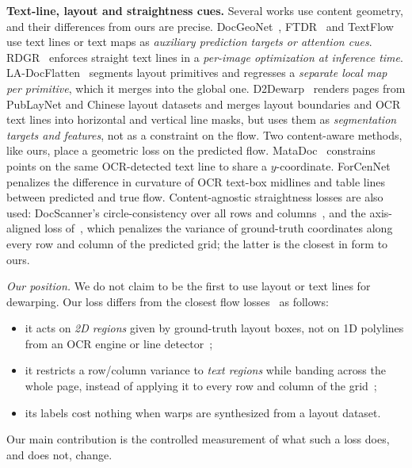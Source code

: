 \documentclass[conference]{IEEEtran}
\begin{document}
\textbf{Text-line, layout and straightness cues.}
Several works use content geometry, and their differences from ours are precise. DocGeoNet~\cite{feng2022docgeonet}, FTDR~\cite{li2023ftdr} and TextFlow~\cite{liu2026textflow} use text lines or text maps as \emph{auxiliary prediction targets or attention cues}. RDGR~\cite{jiang2022rdgr} enforces straight text lines in a \emph{per-image optimization at inference time}. LA-DocFlatten~\cite{li2024ladocflatten} segments layout primitives and regresses a \emph{separate local map per primitive}, which it merges into the global one. D2Dewarp~\cite{li2026d2dewarp} renders pages from PubLayNet and Chinese layout datasets and merges layout boundaries and OCR text lines into horizontal and vertical line masks, but uses them as \emph{segmentation targets and features}, not as a constraint on the flow. Two content-aware methods, like ours, place a geometric loss on the predicted flow. MataDoc~\cite{dai2023matadoc} constrains points on the same OCR-detected text line to share a $y$-coordinate. ForCenNet~\cite{cai2025forcennet} penalizes the difference in curvature of OCR text-box midlines and table lines between predicted and true flow. Content-agnostic straightness losses are also used: DocScanner's circle-consistency over all rows and columns~\cite{feng2025docscanner}, and the axis-aligned loss of~\cite{wang2026aadd}, which penalizes the variance of ground-truth coordinates along every row and column of the predicted grid; the latter is the closest in form to ours.

\emph{Our position.} We do not claim to be the first to use layout or text lines for dewarping. Our loss differs from the closest flow losses~\cite{dai2023matadoc,cai2025forcennet,wang2026aadd} as follows:
\begin{itemize}
\item it acts on \emph{2D regions} given by ground-truth layout boxes, not on 1D polylines from an OCR engine or line detector~\cite{dai2023matadoc,cai2025forcennet};
\item it restricts a row/column variance to \emph{text regions} while banding across the whole page, instead of applying it to every row and column of the grid~\cite{wang2026aadd};
\item its labels cost nothing when warps are synthesized from a layout dataset.
\end{itemize}
Our main contribution is the controlled measurement of what such a loss does, and does not, change.

\end{document}
